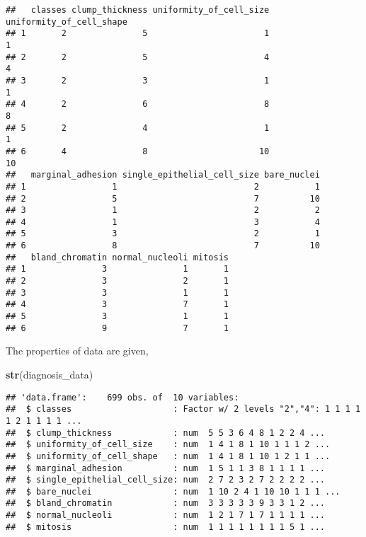 \documentclass[]{article}
\newenvironment{Shaded}{\begin{snugshade}}{\end{snugshade}}
\newcommand{\KeywordTok}[1]{\textcolor[rgb]{0.13,0.29,0.53}{\textbf{#1}}}
\newcommand{\NormalTok}[1]{#1}
\begin{document}
\begin{verbatim}
##   classes clump_thickness uniformity_of_cell_size uniformity_of_cell_shape
## 1       2               5                       1                        1
## 2       2               5                       4                        4
## 3       2               3                       1                        1
## 4       2               6                       8                        8
## 5       2               4                       1                        1
## 6       4               8                      10                       10
##   marginal_adhesion single_epithelial_cell_size bare_nuclei
## 1                 1                           2           1
## 2                 5                           7          10
## 3                 1                           2           2
## 4                 1                           3           4
## 5                 3                           2           1
## 6                 8                           7          10
##   bland_chromatin normal_nucleoli mitosis
## 1               3               1       1
## 2               3               2       1
## 3               3               1       1
## 4               3               7       1
## 5               3               1       1
## 6               9               7       1
\end{verbatim}

The properties of data are given,

\begin{Shaded}
\begin{Highlighting}[]
\KeywordTok{str}\NormalTok{(diagnosis_data)}
\end{Highlighting}
\end{Shaded}

\begin{verbatim}
## 'data.frame':    699 obs. of  10 variables:
##  $ classes                    : Factor w/ 2 levels "2","4": 1 1 1 1 1 2 1 1 1 1 ...
##  $ clump_thickness            : num  5 5 3 6 4 8 1 2 2 4 ...
##  $ uniformity_of_cell_size    : num  1 4 1 8 1 10 1 1 1 2 ...
##  $ uniformity_of_cell_shape   : num  1 4 1 8 1 10 1 2 1 1 ...
##  $ marginal_adhesion          : num  1 5 1 1 3 8 1 1 1 1 ...
##  $ single_epithelial_cell_size: num  2 7 2 3 2 7 2 2 2 2 ...
##  $ bare_nuclei                : num  1 10 2 4 1 10 10 1 1 1 ...
##  $ bland_chromatin            : num  3 3 3 3 3 9 3 3 1 2 ...
##  $ normal_nucleoli            : num  1 2 1 7 1 7 1 1 1 1 ...
##  $ mitosis                    : num  1 1 1 1 1 1 1 1 5 1 ...
\end{verbatim}
\end{document}
